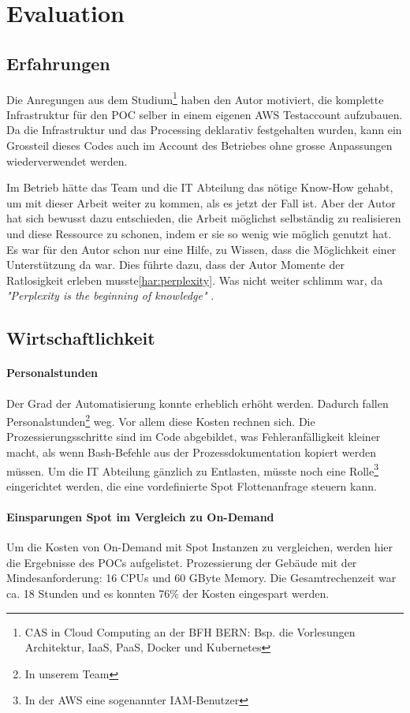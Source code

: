 \section{Evaluation}
\subsection{Erfahrungen}
Die Anregungen aus dem Studium\footnote{CAS in Cloud Computing an der BFH BERN: Bsp. die Vorlesungen Architektur, IaaS, PaaS, Docker und Kubernetes} haben den Autor motiviert, die komplette Infrastruktur für den POC selber in einem eigenen AWS Testaccount aufzubauen. Da die Infrastruktur und das Processing deklarativ festgehalten wurden, kann ein Grossteil dieses Codes auch im Account des Betriebes ohne grosse Anpassungen wiederverwendet werden.

Im Betrieb hätte das Team und die IT Abteilung das nötige Know-How gehabt, um mit dieser Arbeit weiter zu kommen, als es jetzt der Fall ist. Aber der Autor hat sich bewusst dazu entschieden, die Arbeit möglichst selbständig zu realisieren und  diese Ressource zu schonen, indem er sie so wenig wie möglich genutzt hat. Es war für den Autor schon nur eine Hilfe, zu Wissen, dass die Möglichkeit einer Unterstützung da war. Dies führte dazu, dass der Autor Momente der Ratlosigkeit erleben musste\ref{har:perplexity}. Was nicht weiter schlimm war, da \textit{"Perplexity is the beginning of knowledge"} \autocite[33]{CloudNativ:1}.

\subsection{Wirtschaftlichkeit}
\paragraph{Personalstunden}
Der Grad der Automatisierung konnte erheblich erhöht werden. Dadurch fallen Personalstunden\footnote{In unserem Team} weg. Vor allem diese Kosten rechnen sich. Die Prozessierungsschritte sind im Code abgebildet, was Fehleranfälligkeit kleiner macht, als wenn Bash-Befehle aus der Prozessdokumentation kopiert werden müssen. Um die IT Abteilung gänzlich zu Entlasten, müsste noch eine Rolle\footnote{In der AWS eine sogenannter IAM-Benutzer} eingerichtet werden, die eine vordefinierte Spot Flottenanfrage steuern kann.
\paragraph{Einsparungen Spot im Vergleich zu On-Demand}
Um die Kosten von On-Demand mit Spot Instanzen zu vergleichen, werden hier die Ergebnisse des POCs aufgelistet. Prozessierung der Gebäude mit der Mindesanforderung: 16 CPUs und 60 GByte Memory. Die Gesamtrechenzeit war ca. 18 Stunden und es konnten 76\% der Kosten eingespart werden.

